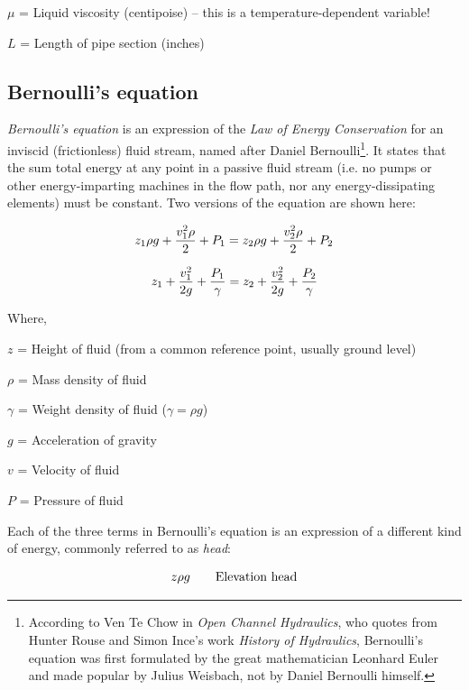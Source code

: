 $\mu$ = Liquid viscosity (centipoise) -- this is a temperature-dependent variable!

$L$ = Length of pipe section (inches)

\vskip 10pt






\filbreak
\subsection{Bernoulli's equation}

\label{Bernoulli's equation}

\textit{Bernoulli's equation} is an expression of the \textit{Law of Energy Conservation} for an inviscid (frictionless) fluid stream, named after Daniel Bernoulli\footnote{According to Ven Te Chow in \textit{Open Channel Hydraulics}, who quotes from Hunter Rouse and Simon Ince's work \textit{History of Hydraulics}, Bernoulli's equation was first formulated by the great mathematician Leonhard Euler and made popular by Julius Weisbach, not by Daniel Bernoulli himself.}.  It states that the sum total energy at any point in a passive fluid stream (i.e. no pumps or other energy-imparting machines in the flow path, nor any energy-dissipating elements) must be constant.  Two versions of the equation are shown here:        

$$z_1 \rho g + {v_1^2 \rho \over 2} + P_1 = z_2 \rho g + {v_2^2 \rho \over 2} + P_2$$

$$z_1 + {v_1^2 \over {2 g}} + {P_1 \over \gamma} = z_2 + {v_2^2 \over {2 g}} + {P_2 \over \gamma}$$

\noindent
Where,

$z$ = Height of fluid (from a common reference point, usually ground level)

$\rho$ = Mass density of fluid

$\gamma$ = Weight density of fluid ($\gamma = \rho g$)

$g$ = Acceleration of gravity

$v$ = Velocity of fluid

$P$ = Pressure of fluid

\vskip 10pt

Each of the three terms in Bernoulli's equation is an expression of a different kind of energy, commonly referred to as \textit{head}: 

$$z \rho g \hbox{\hskip 20pt Elevation head}$$

